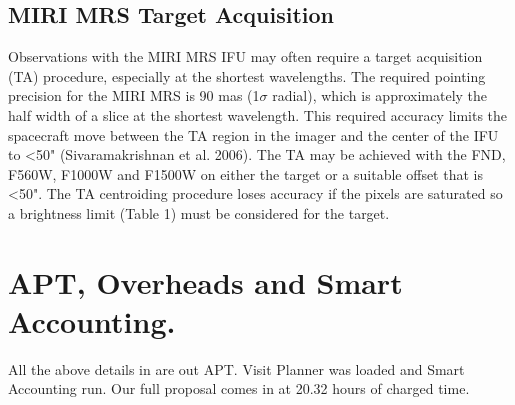 \subsection*{MIRI MRS Target Acquisition}
Observations with the MIRI MRS IFU may often require a target
acquisition (TA) procedure, especially at the shortest
wavelengths. The required pointing precision for the MIRI MRS is 90
mas (1$\sigma$ radial), which is approximately the half width of a
slice at the shortest wavelength. This required accuracy limits the
spacecraft move between the TA region in the imager and the center of
the IFU to <50" (Sivaramakrishnan et al. 2006).  The TA may be
achieved with the FND, F560W, F1000W and F1500W on either the target
or a suitable offset that is <50". The TA centroiding procedure loses
accuracy if the pixels are saturated so a brightness limit (Table 1)
must be considered for the target.

\section*{APT, Overheads and Smart Accounting.}
All the above details in are out APT. 
Visit Planner was loaded and Smart Accounting run. 
Our full proposal comes in at 20.32 hours of charged time. 